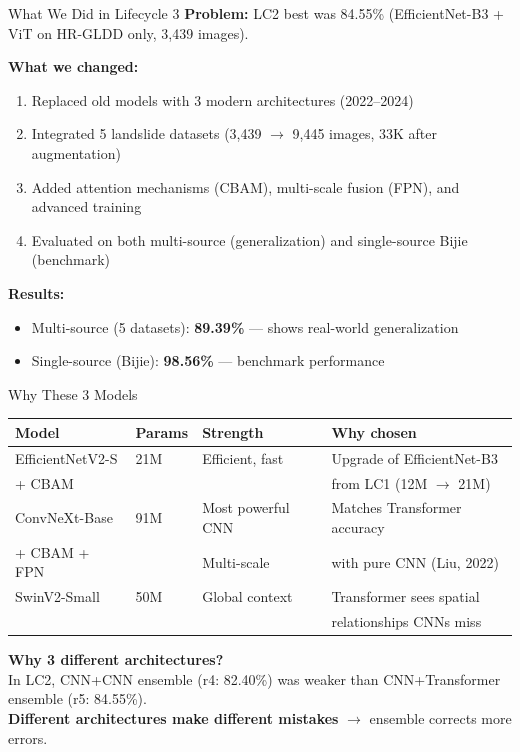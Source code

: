 \documentclass[aspectratio=169]{beamer}
\begin{document}
\begin{frame}{What We Did in Lifecycle 3}
    \textbf{Problem:} LC2 best was 84.55\% (EfficientNet-B3 + ViT on HR-GLDD only, 3,439 images).

    \vspace{0.3cm}
    \textbf{What we changed:}
    \begin{enumerate}
        \item Replaced old models with 3 modern architectures (2022--2024)
        \item Integrated 5 landslide datasets (3,439 $\to$ 9,445 images, 33K after augmentation)
        \item Added attention mechanisms (CBAM), multi-scale fusion (FPN), and advanced training
        \item Evaluated on both multi-source (generalization) and single-source Bijie (benchmark)
    \end{enumerate}

    \vspace{0.3cm}
    \textbf{Results:}
    \begin{itemize}
        \item Multi-source (5 datasets): \textbf{89.39\%} --- shows real-world generalization
        \item Single-source (Bijie): \textbf{98.56\%} --- benchmark performance
    \end{itemize}
\end{frame}

\begin{frame}{Why These 3 Models}
    \begin{table}
        \centering
        \small
        \begin{tabular}{llll}
            \toprule
            \textbf{Model} & \textbf{Params} & \textbf{Strength} & \textbf{Why chosen} \\
            \midrule
            EfficientNetV2-S & 21M & Efficient, fast & Upgrade of EfficientNet-B3 \\
            + CBAM & & & from LC1 (12M $\to$ 21M) \\
            \midrule
            ConvNeXt-Base & 91M & Most powerful CNN & Matches Transformer accuracy \\
            + CBAM + FPN & & Multi-scale & with pure CNN (Liu, 2022) \\
            \midrule
            SwinV2-Small & 50M & Global context & Transformer sees spatial \\
            & & & relationships CNNs miss \\
            \bottomrule
        \end{tabular}
    \end{table}

    \vspace{0.3cm}
    \textbf{Why 3 different architectures?}\\
    In LC2, CNN+CNN ensemble (r4: 82.40\%) was weaker than CNN+Transformer ensemble (r5: 84.55\%).\\
    \textbf{Different architectures make different mistakes} $\to$ ensemble corrects more errors.
\end{frame}
\end{document}
